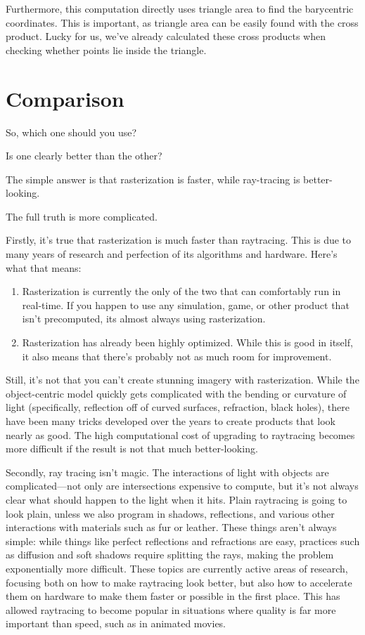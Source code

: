 \documentclass{article}
\begin{document}
Furthermore, this computation directly uses triangle area to find the barycentric coordinates.
This is important, as triangle area can be easily found with the cross product. Lucky for us, we've already calculated these cross products when checking whether points lie inside the triangle.

\section{Comparison}

So, which one should you use?

Is one clearly better than the other?

The simple answer is that rasterization is faster, while ray-tracing is better-looking.

The full truth is more complicated.

Firstly, it's true that rasterization is much faster than raytracing. This is due to many years of research and perfection of its algorithms and hardware. Here's what that means:
\begin{enumerate}
    \item Rasterization is currently the only of the two that can comfortably run in real-time.
    If you happen to use any simulation, game, or other product that isn't precomputed, its almost always using rasterization.
    \item Rasterization has already been highly optimized.
    While this is good in itself, it also means that there's probably not as much room for improvement.
\end{enumerate}
Still, it's not that you can't create stunning imagery with rasterization. While the object-centric model quickly gets complicated with the bending or curvature of light (specifically, reflection off of curved surfaces, refraction, black holes), there have been many tricks developed over the years to create products that look nearly as good. The high computational cost of upgrading to raytracing becomes more difficult if the result is not that much better-looking.

Secondly, ray tracing isn't magic.
The interactions of light with objects are complicated—not only are intersections expensive to compute, but it's not always clear what should happen to the light when it hits.
Plain raytracing is going to look plain, unless we also program in shadows, reflections, and various other interactions with materials such as fur or leather.
These things aren't always simple: while things like perfect reflections and refractions are easy, practices such as diffusion and soft shadows require splitting the rays, making the problem exponentially more difficult.
These topics are currently active areas of research, focusing both on how to make raytracing look better, but also how to accelerate them on hardware to make them faster or possible in the first place.
This has allowed raytracing to become popular in situations where quality is far more important than speed, such as in animated movies.
\end{document}
